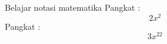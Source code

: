 \documentclass[12pt]{article}
\begin{document}
	Belajar notasi matematika 
	Pangkat : $$2x^2$$
	Pangkat : $$3x^22$$
\end{document}
